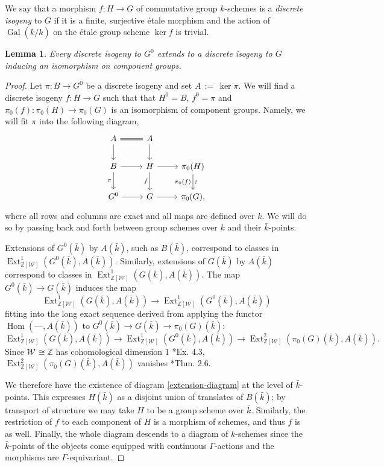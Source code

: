 \documentclass{amsart}
\theoremstyle{plain}
\newtheorem{lemma}[theorem]{Lemma}
\theoremstyle{definition}
\theoremstyle{remark}
\newcommand{\ZZ}{{\mathbb{Z}}}
\newcommand{\bFq}{\bar{k}}
\newcommand{\Fq}{k}
\newcommand{\Weil}[1]{\mathcal{W}_{#1}}
\DeclareMathOperator{\Gal}{Gal}
\DeclareMathOperator{\Hom}{Hom}
\DeclareMathOperator{\Ext}{Ext}
\newcommand{\ceq}{{\, :=\, }}
\begin{document}
We say that a morphism $f : H\to G$ of commutative group $\Fq$-schemes is a {\it discrete isogeny} to $G$ if it is a finite, surjective \'etale morphism and
the action of $\Gal(\bFq/\Fq)$ on the \'etale group scheme $\ker f$ is trivial.

\begin{lemma}\label{lemma:ext}
Every discrete isogeny to $G^0$ extends to a discrete
isogeny to $G$ inducing an isomorphism on component groups.
\end{lemma}

\begin{proof}
Let $\pi: B \to G^0$ be a discrete isogeny and set $A \ceq \ker \pi$.
  We will find a discrete isogeny $f: H\to G$
  such that that $H^0 = B$, $f^0 =\pi$ and
  $\pi_0(f) : \pi_0(H)\to \pi_0(G)$ is an isomorphism of component
  groups.  Namely, we will fit $\pi$ into the following diagram,
  \begin{equation}\label{extension-diagram}
  \begin{tikzcd}
  A \arrow[equal]{r} \dar & A \dar \\
  B \rar \dar[swap]{\pi} & H \rar \dar[swap]{f} & \pi_0(H) \arrow{d}[below,rotate=90]{\sim}[swap]{\pi_0(f)} \\
  G^0 \rar & G \rar & \pi_0(G),
  \end{tikzcd}
  \end{equation}
  where all rows and columns are exact and all maps are defined over
  $\Fq$.  We will do so by passing back and forth between group
  schemes over $\Fq$ and their $\bFq$-points.

  Extensions of $G^0(\bFq)$ by $A(\bFq)$, such as $B(\bFq)$,
  correspond to classes in $\Ext^1_{\ZZ[\Weil{}]}(G^0(\bFq), A(\bFq))$.
  Similarly, extensions of $G(\bFq)$ by $A(\bFq)$ correspond to
  classes in $\Ext^1_{\ZZ[\Weil{}]}(G(\bFq), A(\bFq))$.  The map
  $G^0(\bFq) \to G(\bFq)$ induces the map
  \[
  \Ext^1_{\ZZ[\Weil{}]}(G(\bFq), A(\bFq)) \to \Ext^1_{\ZZ[\Weil{}]}(G^0(\bFq), A(\bFq))
  \]
  fitting into the long exact sequence derived from applying
  the functor $\Hom(\mbox{---}, A(\bFq))$ to $G^0(\bFq) \to G(\bFq) \to \pi_0(G)(\bFq)$:
  \[
  \Ext^1_{\ZZ[\Weil{}]}(G(\bFq), A(\bFq)) \to \Ext^1_{\ZZ[\Weil{}]}(G^0(\bFq), A(\bFq)) \to \Ext^2_{\ZZ[\Weil{}]}(\pi_0(G)(\bFq), A(\bFq)).
  \]
  Since $\Weil{} \cong \ZZ$ has cohomological dimension $1$ \cite{brown:CohomologyGrps}*{Ex. 4.3},
  $\Ext^2_{\ZZ[\Weil{}]}(\pi_0(G)(\bFq), A(\bFq))$ vanishes \cite{cartan-eilenberg:HomologicalAlgebra}*{Thm. 2.6}.

  We therefore have the existence of diagram \eqref{extension-diagram}
  at the level of $\bFq$-points.  This expresses $H(\bFq)$ as a
  disjoint union of translates of $B(\bFq)$; by transport of structure
  we may take $H$ to be a group scheme over $\bFq$.  Similarly, the
  restriction of $f$ to each component of $H$ is a morphism of
  schemes, and thus $f$ is as well.  Finally, the whole diagram
  descends to a diagram of $\Fq$-schemes since the $\bFq$-points of
  the objects come equipped with continuous $\Gamma$-actions and the
  morphisms are $\Gamma$-equivariant.
\end{proof}
\end{document}

